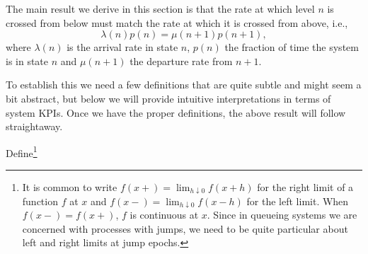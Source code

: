 The main result we derive in this section is that the rate at
which level $n$ is crossed from below must match the rate at which it is crossed from above, i.e.,
\begin{equation*}
  \lambda(n) p(n) = \mu(n+1) p(n+1),
\end{equation*}
where $\lambda(n)$ is the arrival rate in state $n$, $p(n)$ the
fraction of time the system is in state $n$ and $\mu(n+1)$ the
departure rate from $n+1$. 

To establish this we need a few definitions
that are quite subtle and might seem a bit abstract, but below we will
provide intuitive interpretations in terms of system KPIs. Once we
have the proper definitions, the above result will follow
straightaway.


Define\footnote{It is common to write
  $f(x+) = \lim_{h\downarrow0} f(x+h)$ for the right limit of a
  function $f$ at $x$ and $f(x-) = \lim_{h\downarrow0} f(x-h)$ for the
  left limit. When $f(x-)=f(x+)$, $f$ is continuous at $x$. Since in
  queueing systems we are concerned with processes with jumps, we need
  to be quite particular about left and right limits at jump epochs.}
